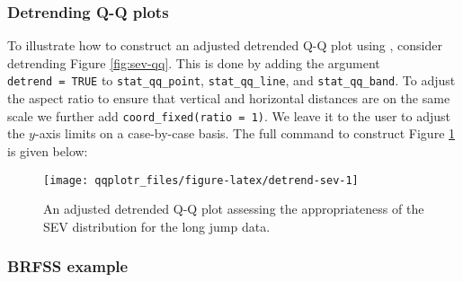\subsubsection{Detrending Q-Q plots}\label{detrending-q-q-plots}

\label{sec:detrending}

To illustrate how to construct an adjusted detrended Q-Q plot using
, consider detrending Figure \ref{fig:sev-qq}. This is done
by adding the argument \texttt{detrend\ =\ TRUE} to
\texttt{stat\_qq\_point}, \texttt{stat\_qq\_line}, and
\texttt{stat\_qq\_band}. To adjust the aspect ratio to ensure that
vertical and horizontal distances are on the same scale we further add
\texttt{coord\_fixed(ratio\ =\ 1)}. We leave it to the user to adjust
the \(y\)-axis limits on a case-by-case basis. The full command to
construct Figure \ref{fig:detrend-sev} is given below:

\begin{Schunk}
\begin{figure}

{\centering \texttt{[image: qqplotr\_files/figure-latex/detrend-sev-1]} 

}

\caption[An adjusted detrended Q-Q plot assessing the appropriateness of the SEV distribution for the long jump data]{An adjusted detrended Q-Q plot assessing the appropriateness of the SEV distribution for the long jump data.}\label{fig:detrend-sev}
\end{figure}
\end{Schunk}

\subsubsection{BRFSS example}\label{brfss-example}


